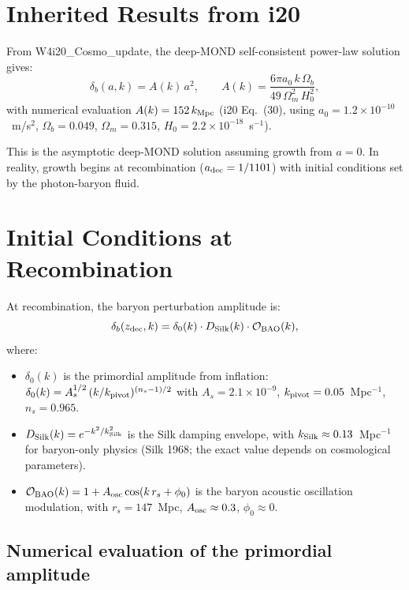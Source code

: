 \documentclass[11pt]{article}
\newcommand{\ee}[1]{\times 10^{#1}}
\newcommand{\aM}{a_0}
\newcommand{\kSilk}{k_{\rm Silk}}
\newcommand{\Ob}{\Omega_b}
\newcommand{\Om}{\Omega_m}
\begin{document}
\section{Inherited Results from i20}

From W4i20\_Cosmo\_update, the deep-MOND self-consistent power-law
solution gives:
\begin{equation}
\delta_b(a, k) = A(k)\,a^2, \qquad
A(k) = \frac{6\pi\aM\,k\,\Ob}{49\,\Om^2\,H_0^2},
\label{eq:Ak-i20}
\end{equation}
with numerical evaluation $A(k) = 152\,k_{\rm Mpc}$
(i20 Eq.~(30), using $\aM = 1.2\ee{-10}$~m/s$^2$,
$\Ob = 0.049$, $\Om = 0.315$, $H_0 = 2.2\ee{-18}$~s$^{-1}$).

This is the asymptotic deep-MOND solution assuming growth from
$a = 0$. In reality, growth begins at recombination ($a_{\rm dec}
= 1/1101$) with initial conditions set by the photon-baryon fluid.

\section{Initial Conditions at Recombination}

At recombination, the baryon perturbation amplitude is:
\begin{equation}
\delta_b(z_{\rm dec}, k) = \delta_0(k)\cdot D_{\rm Silk}(k)
\cdot \mathcal{O}_{\rm BAO}(k),
\label{eq:IC}
\end{equation}
where:
\begin{itemize}
\item $\delta_0(k)$ is the primordial amplitude from inflation:
  $\delta_0(k) = A_s^{1/2}\,(k/k_{\rm pivot})^{(n_s-1)/2}$ with
  $A_s = 2.1\ee{-9}$, $k_{\rm pivot} = 0.05$~Mpc$^{-1}$,
  $n_s = 0.965$.
\item $D_{\rm Silk}(k) = e^{-k^2/\kSilk^2}$ is the Silk damping
  envelope, with $\kSilk \approx 0.13$~Mpc$^{-1}$ for baryon-only
  physics (Silk 1968; the exact value depends on cosmological parameters).
\item $\mathcal{O}_{\rm BAO}(k) = 1 + A_{\rm osc}\cos(k\,r_s + \phi_0)$
  is the baryon acoustic oscillation modulation, with $r_s = 147$~Mpc,
  $A_{\rm osc} \approx 0.3$, $\phi_0 \approx 0$.
\end{itemize}

\subsection{Numerical evaluation of the primordial amplitude}
\end{document}
